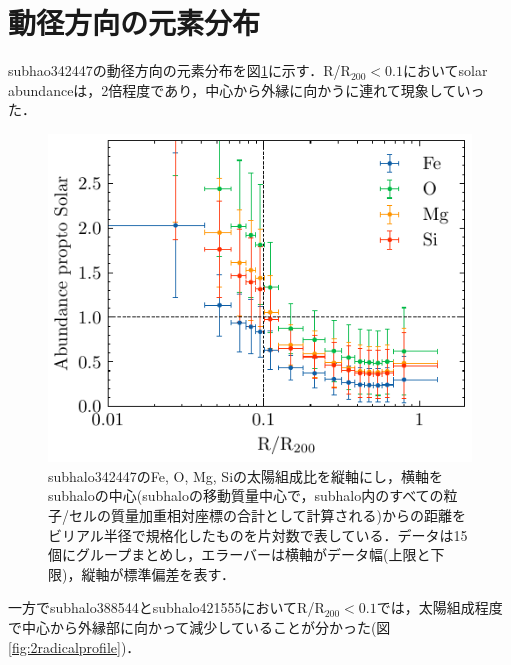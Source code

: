 \documentclass[main.tex]{subfiles}
\begin{document}
	\section{動径方向の元素分布}
	
	subhao342447の動径方向の元素分布を図\ref{fig:abundanceprofile342447}に示す．R/R$_{200} < 0.1$においてsolar abundanceは，2倍程度であり，中心から外縁に向かうに連れて現象していった．
	
	\begin{figure}[htbp]
		\centering
		\includegraphics[width=0.6\linewidth]{pic/abundance_profile342447}
		\captionsetup{width=\linewidth}
		\caption{subhalo342447のFe, O, Mg, Siの太陽組成比を縦軸にし，横軸をsubhaloの中心(subhaloの移動質量中心で，subhalo内のすべての粒子/セルの質量加重相対座標の合計として計算される)からの距離をビリアル半径で規格化したものを片対数で表している．データは15個にグループまとめし，エラーバーは横軸がデータ幅(上限と下限)，縦軸が標準偏差を表す．}
		\label{fig:abundanceprofile342447}
	\end{figure}
	
	一方でsubhalo388544とsubhalo421555においてR/R$_{200} < 0.1$では，太陽組成程度で中心から外縁部に向かって減少していることが分かった(図\ref{fig:2radicalprofile})．
	
\end{document}
